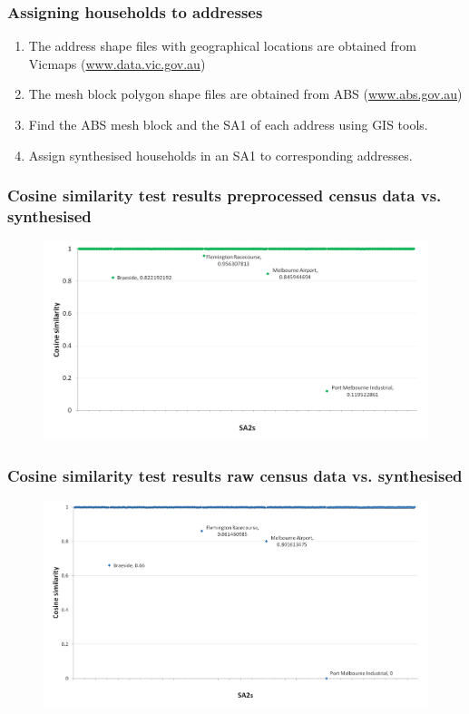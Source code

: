 \begin{frame}%
	\frametitle{Assigning households to addresses}%
	
		
	\begin{enumerate}%
		\setlength\itemsep{1em}%
		\item The address shape files with geographical locations are obtained 
		from Vicmaps (\url{www.data.vic.gov.au}) %
		\item The mesh block polygon shape files are obtained from ABS 
		(\url{www.abs.gov.au})%
		\item Find the ABS mesh block and the SA1 of each address using GIS tools.
    \item Assign synthesised households in an SA1 to corresponding addresses.
	\end{enumerate}%
\end{frame}%

\begin{frame}
  \frametitle{Cosine similarity test results preprocessed census data vs. 
  synthesised}
  
  \begin{figure}%
    \includegraphics[trim={0.5cm
      0 0 0},clip,scale=0.55] 
      {images/cosine-similarity-preprocessed-vs-synth}
  \end{figure}%
  
\end{frame}%

\begin{frame}
  \frametitle{Cosine similarity test results raw census data vs. synthesised}
  
  \begin{figure}%
    \includegraphics[trim={0.5cm
      0 0 0},clip,scale=0.52] 
    {images/cosine-similarity-raw-vs-synth}
  \end{figure}%
  
\end{frame}%


